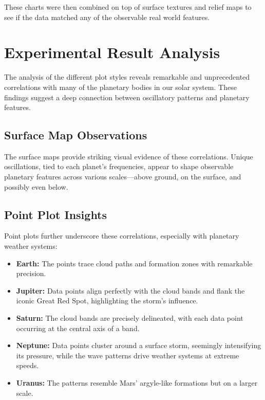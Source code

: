 \documentclass[12pt]{article}
\begin{document}
These charts were then combined on top of surface textures and relief maps to see if the data matched any of the observable real world features.


\section*{Experimental Result Analysis}

The analysis of the different plot styles reveals remarkable and unprecedented correlations with many of the planetary bodies in our solar system. These findings suggest a deep connection between oscillatory patterns and planetary features.

\subsection*{Surface Map Observations}

The surface maps provide striking visual evidence of these correlations. Unique oscillations, tied to each planet's frequencies, appear to shape observable planetary features across various scales—above ground, on the surface, and possibly even below.

\subsection*{Point Plot Insights}

Point plots further underscore these correlations, especially with planetary weather systems:

\begin{itemize}
    \item \textbf{Earth:} The points trace cloud paths and formation zones with remarkable precision.
    \item \textbf{Jupiter:} Data points align perfectly with the cloud bands and flank the iconic Great Red Spot, highlighting the storm’s influence.
    \item \textbf{Saturn:} The cloud bands are precisely delineated, with each data point occurring at the central axis of a band.
    \item \textbf{Neptune:} Data points cluster around a surface storm, seemingly intensifying its pressure, while the wave patterns drive weather systems at extreme speeds.
    \item \textbf{Uranus:} The patterns resemble Mars’ argyle-like formations but on a larger scale.
\end{itemize}
\end{document}
